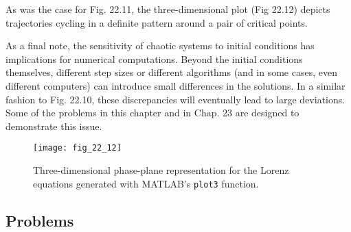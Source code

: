 \documentclass[../main.tex]{subfiles}
\begin{document}
\noindent As was the case for Fig. 22.11, the three-dimensional plot (Fig 22.12) depicts trajectories
cycling in a definite pattern around a pair of critical points.

As a final note, the sensitivity of chaotic systems to initial conditions has implications
for numerical computations. Beyond the initial conditions themselves, different step sizes
or different algorithms (and in some cases, even different computers) can introduce small
differences in the solutions. In a similar fashion to Fig. 22.10, these discrepancies will
eventually lead to large deviations. Some of the problems in this chapter and in Chap. 23
are designed to demonstrate this issue.

\begin{figure}[H]
    \centering
    \texttt{[image: fig\_22\_12]}
   \caption{\textsf{Three-dimensional phase-plane representation for the Lorenz equations generated with MATLAB's \texttt{plot3} function.}}\label{fig:fig_22_12}
\end{figure}\vspace{2cm}


\subsection{Problems}
\end{document}
